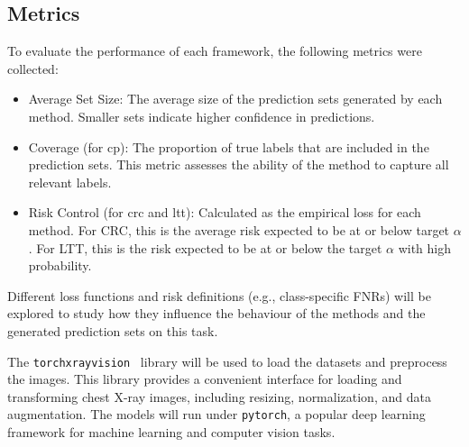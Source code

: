 \subsection{Metrics}

To evaluate the performance of each framework, the following metrics were collected:
\begin{itemize}
    \item Average Set Size:
    The average size of the prediction sets generated by each method. Smaller sets indicate
    higher confidence in predictions.

    \item Coverage (for \gls{cp}):
    The proportion of true labels that are included in the prediction sets.
    This metric assesses the ability of the method to capture all relevant labels.

    \item Risk Control (for \gls{crc} and \gls{ltt}):
    Calculated as the empirical loss for each method.
    For CRC, this is the average risk expected to be at or below target \(\alpha\).
    For LTT, this is the risk expected to be at or below the target \(\alpha\) with high probability.
\end{itemize}

Different loss functions and risk definitions (e.g., class-specific FNRs) will be explored
to study how they influence the behaviour of the methods and the generated prediction sets on this task.

The \texttt{torchxrayvision}~\cite{Cohen2022xrv} library will be used
to load the datasets and preprocess the images.
This library provides a convenient interface for loading and transforming chest X-ray images,
including resizing, normalization, and data augmentation.
The models will run under \texttt{pytorch},
a popular deep learning framework for machine learning and computer vision tasks.
